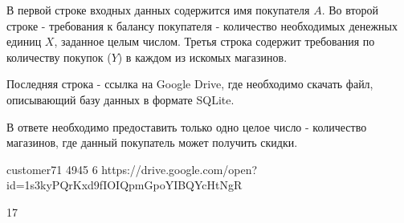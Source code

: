
В первой строке входных данных содержится имя покупателя $A$. Во второй строке - требования к балансу покупателя - количество необходимых денежных единиц $X$, заданное целым числом. Третья строка содержит требования по количеству покупок ($Y$) в каждом из искомых магазинов.

Последняя строка - ссылка на Google Drive, где необходимо скачать файл, описывающий базу данных в формате SQLite.  

\outputfmtSection

В ответе необходимо предоставить только одно целое число - количество магазинов, где данный покупатель может получить скидки.

\exampleSection


\footnotesize
\begin{myverbbox}[\small]{\vinput}
customer71
4945
6
https://drive.google.com/open?id=1s3kyPQrKxd9fIOIQpmGpoYIBQYcHtNgR
\end{myverbbox}
\begin{myverbbox}[\small]{\voutput}
17
\end{myverbbox}
\normalsize

